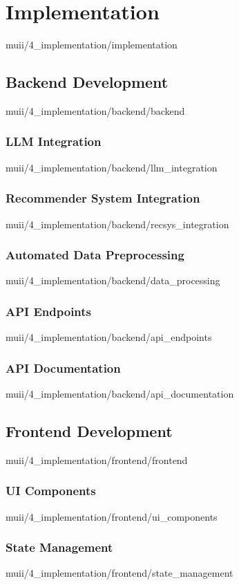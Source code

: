 \documentclass[english,epsbased,copyright,final,printable,covers,extendedindex,firstnumbered,tfm,gnuplot,loc,loe,lof,lot]{tfgtfmthesisuam}
\begin{document}
  \chapter{Implementation\label{CAP:IMPLEMENTATION}}{muii/4_implementation/implementation}
    \section{Backend Development\label{SEC:BACKDEV}}{muii/4_implementation/backend/backend}
      \subsection{LLM Integration\label{SS:LLMINTEG}}{muii/4_implementation/backend/llm_integration}
      \subsection{Recommender System Integration\label{SS:RECSYSINTEG}}{muii/4_implementation/backend/recsys_integration}
      \subsection{Automated Data Preprocessing\label{SS:AUTODATAPREPROC}}{muii/4_implementation/backend/data_processing}

      \subsection{API Endpoints\label{SS:ENDPOINTS}}{muii/4_implementation/backend/api_endpoints}
      \subsection{API Documentation\label{SS:DOCS}}{muii/4_implementation/backend/api_documentation}

    \section{Frontend Development\label{SEC:FRONTDEV}}{muii/4_implementation/frontend/frontend}
      \subsection{UI Components\label{SS:UICOMPS}}{muii/4_implementation/frontend/ui_components}
      \subsection{State Management\label{SS:STATEMAN}}{muii/4_implementation/frontend/state_management}
\end{document}
